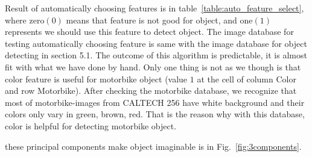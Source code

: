 Result of automatically choosing features is in table~\ref{table:auto_feature_select}, where
zero$(0)$ means that feature is not good for object, and one$(1)$
represents we should use this feature to detect object. The image
database for testing automatically choosing feature is same with the
image database for object detecting in section 5.1. The outcome of
this algorithm is predictable, it is almost fit with what we have done
by hand. Only one thing is not as we though is that color feature is
useful for motorbike object (value $1$ at the cell of column Color and
row Motorbike). After checking the motorbike database, we
recognize that most of motorbike-images from CALTECH 256 have
white background and their colors only vary in green, brown, red.
That is the reason why with this database, color is helpful for
detecting motorbike object.


these principal components make object imaginable is in Fig.~\ref{fig:3components}.








